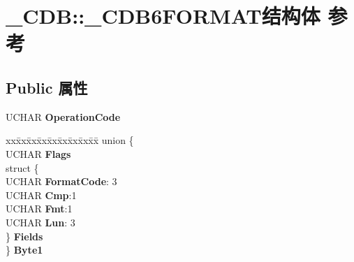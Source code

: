 \hypertarget{struct___c_d_b_1_1___c_d_b6_f_o_r_m_a_t}{}\section{\+\_\+\+C\+DB\+:\+:\+\_\+\+C\+D\+B6\+F\+O\+R\+M\+A\+T结构体 参考}
\label{struct___c_d_b_1_1___c_d_b6_f_o_r_m_a_t}
\subsection*{Public 属性}
\begin{DoxyCompactItemize}
\item 
\mbox{\label{struct___c_d_b_1_1___c_d_b6_f_o_r_m_a_t_aa6b01abcfc1946fc0e374355bdf8dd88}} 
U\+C\+H\+AR {\bfseries Operation\+Code}
\item 
\mbox{\label{struct___c_d_b_1_1___c_d_b6_f_o_r_m_a_t_a2d152ea336a7795e07a47ba3e1fbac10}} 
\begin{tabbing}
xx\=xx\=xx\=xx\=xx\=xx\=xx\=xx\=xx\=\kill
union \{\\
\>UCHAR {\bfseries Flags}\\
\>struct \{\\
\>\>UCHAR {\bfseries FormatCode}: 3\\
\>\>UCHAR {\bfseries Cmp}:1\\
\>\>UCHAR {\bfseries Fmt}:1\\
\>\>UCHAR {\bfseries Lun}: 3\\
\>\} {\bfseries Fields}\\
\} {\bfseries Byte1}\\


\end{tabbing}
\end{DoxyCompactItemize}
